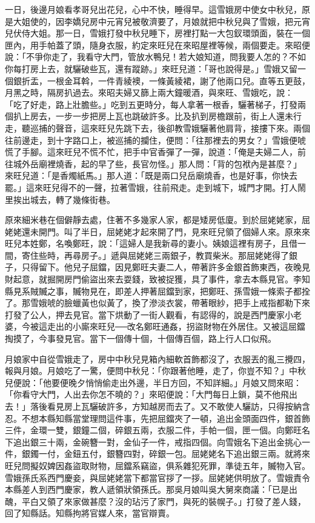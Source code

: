 一日，後邊月娘看孝哥兒出花兒，心中不快，睡得早。這雪娥房中使女中秋兒，原是大姐使的，因李嬌兒房中元宵兒被敬濟要了，月娘就把中秋兒與了雪娥，把元宵兒伏侍大姐。那一日，雪娥打發中秋兒睡下，房裡打點一大包釵環頭面，裝在一個匣內，用手帕蓋了頭，隨身衣服，約定來旺兒在來昭屋裡等候，兩個要走。來昭便說：「不爭你走了，我看守大門，管放水鴨兒！若大娘知道，問我要人怎的？不如你每打房上去，就驪破些瓦，還有蹤跡。」來旺兒道：「哥也說得是。」雪娥又留一個銀折盂，一根金耳斡，一件青綾襖，一條黃綾裙，謝了他兩口兒。直等五更鼓，月黑之時，隔房扒過去。來昭夫婦又篩上兩大鐘暖酒，與來旺、雪娥吃，說： 「吃了好走，路上壯膽些。」吃到五更時分，每人拿著一根香，驪著梯子，打發兩個扒上房去，一步一步把房上瓦也跳破許多。比及扒到房檐跟前，街上人還未行走，聽巡捕的聲音，這來旺兒先跳下去，後卻教雪娥驪著他肩背，接摟下來。兩個往前邊走，到十字路口上，被巡捕的攔住，便問：「往那裡去的男女？」雪娥便唬慌了手腳。這來旺兒不慌不忙，把手中官香彈了一彈，說道：「俺是夫婦二人，前往城外岳廟裡燒香，起的早了些，長官勿怪。」那人問：「背的包袱內是甚麼？」 來旺兒道：「是香燭紙馬。」那人道：「既是兩口兒岳廟燒香，也是好事，你快去罷。」這來旺兒得不的一聲，拉著雪娥，往前飛走。走到城下，城門才開。打人鬧里挨出城去，轉了幾條街巷。

原來細米巷在個僻靜去處，住著不多幾家人家，都是矮房低廈。到於屈姥姥家，屈姥姥還未開門。叫了半日，屈姥姥才起來開了門，見來旺兒領了個婦人來。原來來旺兒本姓鄭，名喚鄭旺，說：「這婦人是我新尋的妻小。姨娘這裡有房子，且借一間，寄住些時，再尋房子。」遞與屈姥姥三兩銀子，教買柴米。那屈姥姥得了銀子，只得留下。他兒子屈鐺，因見鄭旺夫妻二人，帶著許多金銀首飾東西，夜晚見財起意，就掘開房門偷盜出來去耍錢，致被捉獲，具了事件，拿去本縣見官。李知縣見系賊贓之事，贓物見在，即差人押著屈鐺到家，把鄭旺、孫雪娥一條索子都拴了。那雪娥唬的臉蠟黃也似黃了，換了滲淡衣裳，帶著眼紗，把手上戒指都勒下來打發了公人，押去見官。當下烘動了一街人觀看，有認得的，說是西門慶家小老婆，今被這走出的小廝來旺兒──改名鄭旺通姦，拐盜財物在外居住。又被這屈鐺掏摸了，今事發見官。當下一個傳十個，十個傳百個，路上行人口似飛。

月娘家中自從雪娥走了，房中中秋兒見箱內細軟首飾都沒了，衣服丟的亂三攪四，報與月娘。月娘吃了一驚，便問中秋兒：「你跟著他睡，走了，你豈不知？」中秋兒便說：「他要便晚夕悄悄偷走出外邊，半日方回，不知詳細。」月娘又問來昭：「你看守大門，人出去你怎不曉的？」來昭便說：「大門每日上鎖，莫不他飛出去！」落後看見房上瓦驪破許多，方知越房而去了。又不敢使人驪訪，只得按納含忍。不想本縣知縣當堂理問這件事，先把屈鐺夾了一頓，追出金頭面四件，銀首飾三件，金環一雙，銀鐘二個，碎銀五兩，衣服二件，手帕一個，匣一個。向鄭旺名下追出銀三十兩，金碗簪一對，金仙子一件，戒指四個。向雪娥名下追出金挑心一件，銀鐲一付，金鈕五付，銀簪四對，碎銀一包。屈姥姥名下追出銀三兩。就將來旺兒問擬奴婢因姦盜取財物，屈鐺系竊盜，俱系雜犯死罪，準徒五年，贓物入官。雪娥孫氏系西門慶妾，與屈姥姥當下都當官拶了一拶。屈姥姥供明放了。雪娥責令本縣差人到西門慶家，教人遞領狀領孫氏。那吳月娘叫吳大舅來商議：「已是出醜，平白又領了來家做甚麼？沒的玷污了家門，與死的裝幌子。」打發了差人錢，回了知縣話。知縣拘將官媒人來，當官辯賣。

